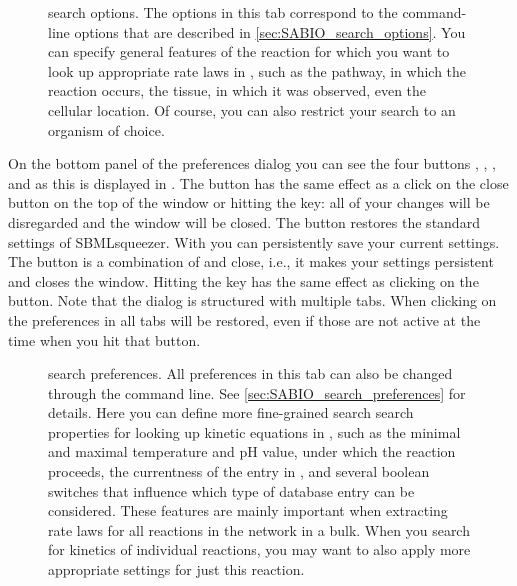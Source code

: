 \begin{figure}
\caption[\SABIO search options]{\SABIO search options.
The options in this tab correspond to the command-line options that are described
in \vref{sec:SABIO_search_options}.
You can specify general features of the reaction for which you want to look up
appropriate rate laws in \SABIO, such as the pathway, in which the reaction
occurs, the tissue, in which it was observed, even the cellular location.
Of course, you can also restrict your search to an organism of choice.}
\label{fig:SABIO-RK_search_options}
\end{figure}
On the bottom panel of the preferences dialog you can see the four buttons
, , , and  as this is displayed in
.
The  button has the same effect as a click on the close button on the
top of the window or hitting the \keys{\escwin} key: all of your changes will be
disregarded and the window will be closed.
The  button restores the standard settings of SBMLsqueezer.
With  you can persistently save your current settings.
The  button is a combination of  and close, i.e., it makes your
settings persistent and closes the window.
Hitting the \keys{\return} key has the same effect as clicking on the  button.
Note that the dialog is structured with multiple tabs. When clicking on
 the preferences in all tabs will be restored, even if those are not
active at the time when you hit that button.
\begin{figure}
\caption[\SABIO search preferences]{\SABIO search preferences.
All preferences in this tab can also be changed through the command line.
See \vref{sec:SABIO_search_preferences} for details.
Here you can define more fine-grained search search properties for looking up
kinetic equations in \SABIO, such as the minimal and maximal temperature and
pH value, under which the reaction proceeds, the currentness of the entry in
\SABIO, and several boolean switches that influence which type of database entry
can be considered.
These features are mainly important when extracting rate laws for all reactions
in the network in a bulk.
When you search for kinetics of individual reactions, you may want to also apply
more appropriate settings for just this reaction.}
\label{fig:SABIO-RK_search_preferences}
\end{figure}
